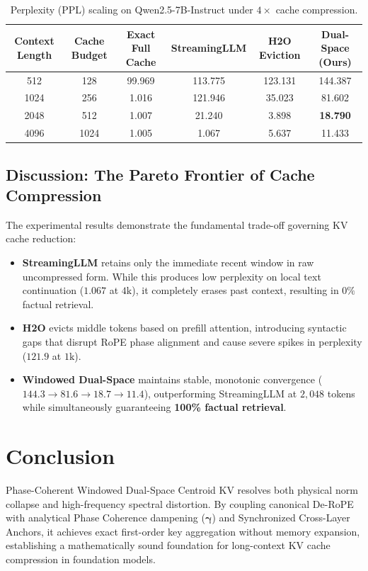 \documentclass[11pt,a4paper]{article}
\begin{document}
\begin{table}[h]
\centering
\caption{Perplexity (PPL) scaling on Qwen2.5-7B-Instruct under $4\times$ cache compression.}
\label{tab:ppl_scaling}
\begin{tabular}{cccccc}
\toprule
\textbf{Context Length} & \textbf{Cache Budget} & \textbf{Exact Full Cache} & \textbf{StreamingLLM} & \textbf{H2O Eviction} & \textbf{Dual-Space (Ours)} \\
\midrule
512  & 128  & 99.969 & 113.775 & 123.131 & 144.387 \\
1024 & 256  & 1.016  & 121.946 & 35.023  & 81.602 \\
2048 & 512  & 1.007  & 21.240  & 3.898   & \textbf{18.790} \\
4096 & 1024 & 1.005  & 1.067   & 5.637   & 11.433 \\
\bottomrule
\end{tabular}
\end{table}

\subsection{Discussion: The Pareto Frontier of Cache Compression}
The experimental results demonstrate the fundamental trade-off governing KV cache reduction:
\begin{itemize}
    \item \textbf{StreamingLLM} retains only the immediate recent window in raw uncompressed form. While this produces low perplexity on local text continuation ($1.067$ at $4\text{k}$), it completely erases past context, resulting in $0\%$ factual retrieval.
    \item \textbf{H2O} evicts middle tokens based on prefill attention, introducing syntactic gaps that disrupt RoPE phase alignment and cause severe spikes in perplexity ($121.9$ at $1\text{k}$).
    \item \textbf{Windowed Dual-Space} maintains stable, monotonic convergence ($144.3 \to 81.6 \to 18.7 \to 11.4$), outperforming StreamingLLM at $2,048$ tokens while simultaneously guaranteeing \textbf{100\% factual retrieval}.
\end{itemize}

\section{Conclusion}
Phase-Coherent Windowed Dual-Space Centroid KV resolves both physical norm collapse and high-frequency spectral distortion. By coupling canonical De-RoPE with analytical Phase Coherence dampening ($\boldsymbol{\gamma}$) and Synchronized Cross-Layer Anchors, it achieves exact first-order key aggregation without memory expansion, establishing a mathematically sound foundation for long-context KV cache compression in foundation models.
\end{document}
